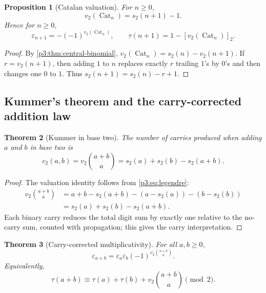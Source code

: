 \documentclass[11pt,oneside]{article}
\newtheorem{theorem}{Theorem}[section]
\newtheorem{proposition}[theorem]{Proposition}
\theoremstyle{definition}
\theoremstyle{remark}
\newcommand{\vtwo}{v_2}
\newcommand{\bitsum}{s_2}
\newcommand{\eps}{\varepsilon}
\newcommand{\res}[2]{\left[#1\right]_{#2}}
\newcommand{\Cat}{\operatorname{Cat}}
\begin{document}
\begin{proposition}[Catalan valuation]\label{p3:prop:catalan}
For $n\ge0$,
\begin{equation}\label{p3:eq:catalan-v2}
 \vtwo(\Cat_n)=\bitsum(n+1)-1.
\end{equation}
Hence for $n\ge0$,
\begin{equation}\label{p3:eq:catalan-thue-morse}
 \eps_{n+1}=-(-1)^{\vtwo(\Cat_n)},
 \qquad
 \tau(n+1)=1-\res{\vtwo(\Cat_n)}{2}.
\end{equation}
\end{proposition}

\begin{proof}
By \cref{p3:thm:central-binomial},
$\vtwo(\Cat_n)=\bitsum(n)-\vtwo(n+1)$.  If $r=\vtwo(n+1)$, then adding $1$ to
$n$ replaces exactly $r$ trailing $1$'s by $0$'s and then changes one $0$ to
$1$.  Thus $\bitsum(n+1)=\bitsum(n)-r+1$.
\end{proof}

\subsection{Kummer's theorem and the carry-corrected addition law}

\begin{theorem}[Kummer in base two]\label{p3:thm:kummer}
The number of carries produced when adding $a$ and $b$ in base two is
\begin{equation}\label{p3:eq:kummer}
 c_2(a,b)=\vtwo\binom{a+b}{a}
         =\bitsum(a)+\bitsum(b)-\bitsum(a+b).
\end{equation}
\end{theorem}

\begin{proof}
The valuation identity follows from \cref{p3:eq:legendre}:
\begin{align*}
 \vtwo\binom{a+b}{a}
 &=a+b-\bitsum(a+b)-(a-\bitsum(a))-(b-\bitsum(b))\\
 &=\bitsum(a)+\bitsum(b)-\bitsum(a+b).
\end{align*}
Each binary carry reduces the total digit sum by exactly one relative to the
no-carry sum, counted with propagation; this gives the carry interpretation.
\end{proof}

\begin{theorem}[Carry-corrected multiplicativity]\label{p3:thm:carry-law}
For all $a,b\ge0$,
\begin{equation}\label{p3:eq:carry-law}
 \boxed{\ \eps_{a+b}=\eps_a\eps_b
     (-1)^{\vtwo\binom{a+b}{a}}.\ }
\end{equation}
Equivalently,
\begin{equation}\label{p3:eq:tau-carry-law}
 \tau(a+b)\equiv \tau(a)+\tau(b)+\vtwo\binom{a+b}{a}\pmod2.
\end{equation}
\end{theorem}
\end{document}
